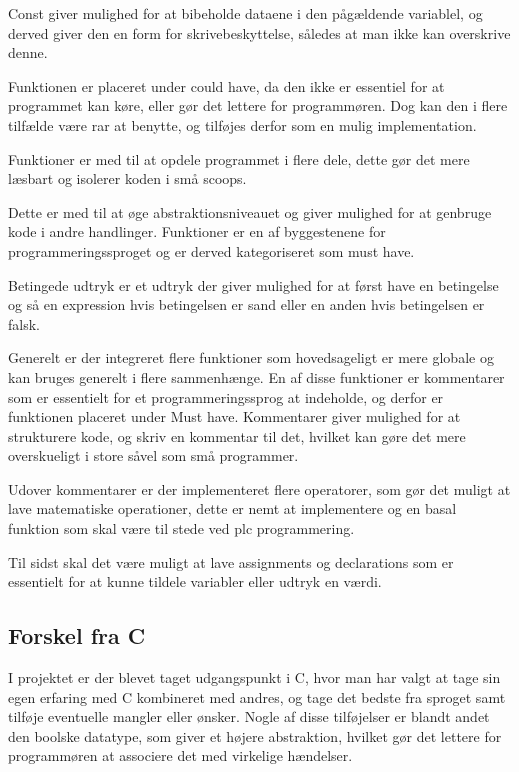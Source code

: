 Const giver mulighed for at bibeholde dataene i den pågældende variablel, og derved giver den en form for skrivebeskyttelse, således at man ikke kan overskrive denne.

Funktionen er placeret under could have, da den ikke er essentiel for at programmet kan køre, eller gør det lettere for programmøren. 
Dog kan den i flere tilfælde være rar at benytte, og tilføjes derfor som en mulig implementation.

Funktioner er med til at opdele programmet i flere dele, dette gør det mere læsbart og isolerer koden i små scoops.

Dette er med til at øge abstraktionsniveauet og giver mulighed for at genbruge kode i andre handlinger.
Funktioner er en af byggestenene for programmeringssproget og er derved kategoriseret som must have.

Betingede udtryk er et udtryk der giver mulighed for at først have en betingelse og så en expression hvis betingelsen er sand eller en anden hvis betingelsen er falsk.

Generelt er der integreret flere funktioner som hovedsageligt er mere globale og kan bruges generelt i flere sammenhænge. En af disse funktioner er kommentarer som er essentielt for et programmeringssprog at indeholde, og derfor er funktionen placeret under Must have. Kommentarer giver mulighed for at strukturere kode, og skriv en kommentar til det, hvilket kan gøre det mere overskueligt i store såvel som små programmer.

Udover kommentarer er der implementeret flere operatorer, som gør det muligt at lave matematiske operationer, dette er nemt at implementere og en basal funktion som skal være til stede ved \gls{plc} programmering.

Til sidst skal det være muligt at lave assignments og declarations som er essentielt for at kunne tildele variabler eller udtryk en værdi.

\subsection{Forskel fra C}
\label{sec:forskelfrac}
I projektet er der blevet taget udgangspunkt i C, hvor man har valgt at tage sin egen erfaring med C kombineret med andres, og tage det bedste fra sproget samt tilføje eventuelle mangler eller ønsker.
Nogle af disse tilføjelser er blandt andet den boolske datatype, som giver et højere abstraktion, hvilket gør det  lettere for programmøren at associere det med virkelige hændelser.

